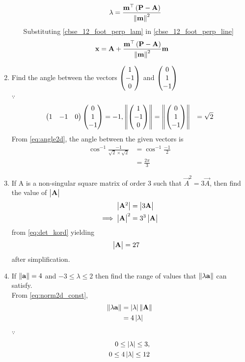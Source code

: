 \documentclass[journal,12pt,twocolumn]{IEEEtran}
\renewcommand\thesection{\arabic{section}}
\begin{document}
\begin{enumerate}[label=\thesection.\arabic*.,ref=\thesection.\theenumi]
\begin{enumerate}
\begin{align}
	\label{cbse_12_foot_perp_lam}
	\lambda = \frac{	\mathbf{m}^{\top}\left(\mathbf{P}  -  \mathbf{A}\right)}{\left\lVert\mathbf{m}\right\rVert^2}
		\end{align}
		Substituting 
	\eqref{cbse_12_foot_perp_lam}
	in 
	\eqref{cbse_12_foot_perp_line}
\begin{align}
	\label{cbse_12_foot_perp_pt}
\mathbf{x} &=  \mathbf{A} + \frac{	\mathbf{m}^{\top}\left(\mathbf{P}  -  \mathbf{A}\right)}{\left\lVert\mathbf{m}\right\rVert^2}\mathbf{m}
		\end{align}
		\end{enumerate}
	\item  Find the angle between the vectors $ \begin{pmatrix}1 \\ -1 \\ 0\end{pmatrix} $ and $ \begin{pmatrix}0 \\ 1 \\ -1\end{pmatrix} $ 
\\
\solution $\because$
%
  \begin{align}
	  \begin{pmatrix}1 & -1 & 0\end{pmatrix} \begin{pmatrix}0 \\ 1 \\ -1\end{pmatrix} &= -1,
	  \left\lVert\begin{pmatrix}1 \\ -1 \\ 0\end{pmatrix}\right\rVert=\left\lVert\begin{pmatrix}0 \\ 1 \\ -1\end{pmatrix}\right\rVert &= \sqrt{2}
  \end{align}
		From 
    \eqref{eq:angle2d}, the angle between the given vectors is 
  \begin{align}
 \cos^{-1}\frac{-1}{\sqrt{2} \times 
\sqrt{2}
	  } &= 
 \cos^{-1}\frac{-1}{2
	  } 
	  \\
	  &= \frac{2\pi}{3}
  \end{align}
\item  If A is a non-singular square matrix of order 3 such that $ \vec{A}^2 =3\vec{ A}$, then find the value of  $\begin{vmatrix}\mathbf{A}\end{vmatrix}$ 
	\\
	\solution 
  \begin{align}
	  \begin{vmatrix}\mathbf{A}^2\end{vmatrix} &=\begin{vmatrix}3\mathbf{ A}\end{vmatrix}
	  \\
	  \implies 
	  \begin{vmatrix}\mathbf{A}\end{vmatrix} ^2&=3^3\begin{vmatrix}\mathbf{ A}\end{vmatrix}
  \end{align}
  from 
	\eqref{eq:det_kord}
	yielding 
  \begin{align}
	  \begin{vmatrix}\mathbf{A}\end{vmatrix} &=27
  \end{align}
  after simplification.
\item  If $\left\lVert\mathbf{a}\right\rVert
	 = 4 $ and  $ -3\leq \lambda \leq 2 $ then find the range of values that $\left\lVert\lambda \mathbf{a}\right\rVert$ can satisfy.
	 \\
	 \solution  From 
  \eqref{eq:norm2d_const}, 
\begin{align}
  \left\lVert\lambda \mathbf{a}\right\rVert 
  &= \left\vert\lambda\right\vert \left\lVert\mathbf{A}\right\rVert
  \\
	&= 4\left\vert\lambda\right\vert 
\end{align}
$\because$
\begin{align}
	0 \leq \left\vert\lambda\right\vert \leq 3,  
\\
	0 \leq 4\left\vert\lambda\right\vert \leq 12
\end{align}


\end{enumerate}
\end{document}

